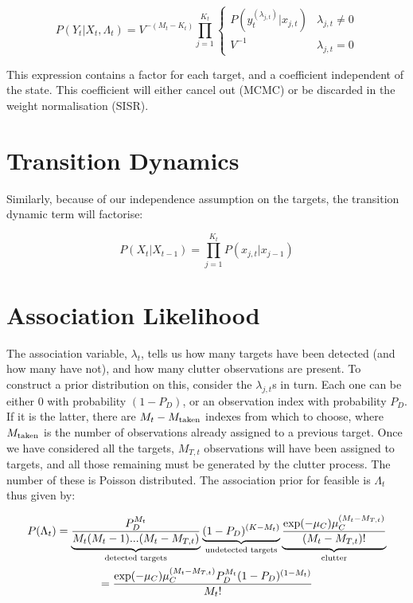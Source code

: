 \begin{equation}
P(Y_t|X_t, \Lambda_t) = V^{-(M_t-K_t)} \prod_{j=1}^{K_t} \begin{cases} P(y_t^{(\lambda_{j,t})}|x_{j,t}) & \lambda_{j,t} \ne 0 \\ V^{-1} & \lambda_{j,t} = 0 \end{cases}
\label{eq:MTFactorisedLikelihood}
\end{equation}

This expression contains a factor for each target, and a coefficient independent of the state. This coefficient will either cancel out (MCMC) or be discarded in the weight normalisation (SISR).



\section{Transition Dynamics}
Similarly, because of our independence assumption on the targets, the transition dynamic term will factorise:

\begin{equation}
P(X_t|X_{t-1}) = \prod_{j=1}^{K_t} P(x_{j,t}|x_{j-1})
\label{eq:MTFactorisedTransition}
\end{equation}



\section{Association Likelihood}
The association variable, $\lambda_t$, tells us how many targets have been detected (and how many have not), and how many clutter observations are present. To construct a prior distribution on this, consider the $\lambda_{j,t}$s in turn. Each one can be either 0 with probability $(1-P_D)$, or an observation index with probability $P_D$. If it is the latter, there are $M_t - M_{\textnormal{taken}}$ indexes from which to choose, where $M_{\textnormal{taken}}$ is the number of observations already assigned to a previous target. Once we have considered all the targets, $M_{T,t}$ observations will have been assigned to targets, and all those remaining must be generated by the clutter process. The number of these is Poisson distributed. The association prior for feasible is $\Lambda_t$ thus given by:

\begin{multline}
P(\Lambda_t) = \underbrace{\frac{P_D^{M_t}}{M_t(M_t-1)...(M_t-M_{T,t})}}_\textnormal{detected targets} \underbrace{(1-P_D)^{(K-M_t)}}_\textnormal{undetected targets} \underbrace{\frac{\exp(-\mu_C) \mu_C^{(M_t-M_{T,t})}}{(M_t-M_{T,t})!}}_\textnormal{clutter} \\
= \frac{ \exp(-\mu_C) \mu_C^{(M_t-M_{T,t})} P_D^{M_t} (1-P_D)^{(1-M_t)} }{ M_t! }
\label{eq:MTAssociationLikelihood}
\end{multline}

